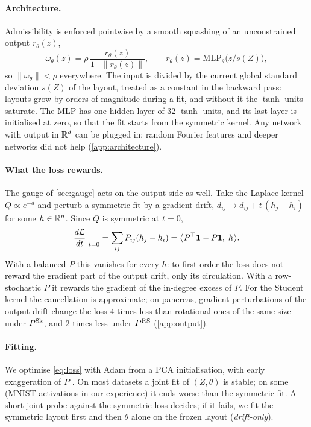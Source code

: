 \paragraph{Architecture.}
Admissibility is enforced pointwise by a smooth squashing of an
unconstrained output $r_\theta(z)$,
\begin{equation}
  \omega_\theta(z)=\rho\,\frac{r_\theta(z)}{1+\|r_\theta(z)\|},\qquad
  r_\theta(z)=\mathrm{MLP}_\theta\big(z/s(Z)\big),
  \label{eq:flow}
\end{equation}
so $\|\omega_\theta\|<\rho$ everywhere. The input is divided by the
current global standard deviation $s(Z)$ of the layout, treated as a
constant in the backward pass: layouts grow by orders of magnitude during
a fit, and without it the $\tanh$ units saturate. The MLP has one hidden
layer of 32 $\tanh$ units, and its last layer is initialised at zero, so
that the fit starts from the symmetric kernel. Any network with output
in $\mathbb{R}^d$ can be plugged in; random Fourier features
\citep{rahimi2007rff} and deeper networks did not help
(\cref{app:architecture}).

\paragraph{What the loss rewards.}
The gauge of \cref{sec:gauge} acts on the output side as well. Take the
Laplace kernel $Q\propto e^{-d}$ and perturb a symmetric fit by a
gradient drift, $d_{ij}\to d_{ij}+t\,(h_j-h_i)$ for some $h\in\mathbb{R}^n$. Since
$Q$ is symmetric at $t=0$,
\begin{equation}
  \frac{d\mathcal{L}}{dt}\Big|_{t=0}=\sum_{ij}P_{ij}(h_j-h_i)=\big\langle P^\top\mathbf{1}-P\mathbf{1},\;h\big\rangle .
  \label{eq:firstorder}
\end{equation}
With a balanced $P$ this vanishes for every $h$: to first order the loss
does not reward the gradient part of the output drift, only its
circulation. With a row-stochastic $P$ it rewards the gradient of the
in-degree excess of $P$. For the Student kernel the cancellation is
approximate; on pancreas, gradient perturbations of the output drift
change the loss $4$ times less than rotational ones of the same size under
$P^{\operatorname{Sk}}$, and $2$ times less under $P^{\operatorname{RS}}$ (\cref{app:output}).

\paragraph{Fitting.}
We optimise \eqref{eq:loss} with Adam from a PCA initialisation, with
early exaggeration of $P$ \citep{vandermaaten2008tsne,kobak2019art}. On
most datasets a joint fit of $(Z,\theta)$ is stable; on some (MNIST
activations in our experience) it ends worse than the symmetric fit. A
short joint probe against the symmetric loss decides; if it fails, we fit
the symmetric layout first and then $\theta$ alone on the frozen layout
(\emph{drift-only}).

